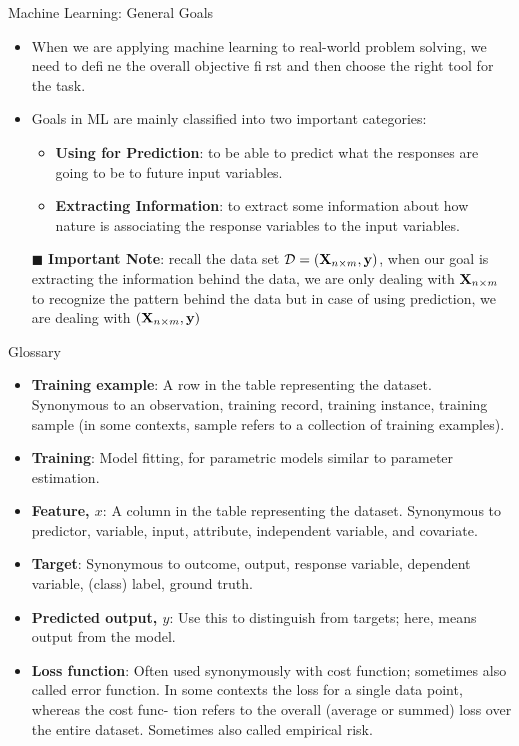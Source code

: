 \documentclass[compress,oilve]{beamer}
\begin{document}
\begin{frame}{Machine Learning: General Goals}
\begin{itemize}
\item When we are applying machine learning to real-world
problem solving, we need to define the overall objective first and then choose the right tool
for the task.
\item Goals in ML are mainly classified into two important categories:
\begin{itemize}
\item \textbf{Using for Prediction}: to be able to predict what the responses are going to be to future input variables.
\item \textbf{Extracting Information}: to extract some information about how nature is associating the response variables to the input variables.
\end{itemize}
\item[$\blacksquare$] \textbf{Important Note}: recall the data set $ \mathcal{D} = (\mathbf{X_{\mathnormal n \times \mathnormal m}} , \mathbf{y}) $, when our goal is extracting the information behind the data, we are only dealing with $ \mathbf{X_{\mathnormal n \times \mathnormal m}} $ to recognize the pattern behind the data but in case of using prediction, we are dealing with $ (\mathbf{X_{\mathnormal n \times \mathnormal m}} , \mathbf{y}) $
\end{itemize}
\end{frame}


\begin{frame}{Glossary}
\begin{itemize}
\item \textbf{Training example}: A row in the table representing the dataset. Synonymous to an observation, training record, training instance, training sample (in some contexts, sample refers to a collection of training examples).
\item \textbf{Training}: Model fitting, for parametric models similar to parameter estimation.
\item \textbf{Feature, $x$}: A column in the table representing the dataset. Synonymous to predictor, variable, input, attribute, independent variable, and covariate.
\item \textbf{Target}: Synonymous to outcome, output, response variable, dependent variable, (class) label, ground truth.
\item \textbf{Predicted output, $\hat{y}$}: Use this to distinguish from targets; here, means output from the model.
\item \textbf{Loss function}: Often used synonymously with cost function; sometimes also called error function. In some contexts the loss for a single data point, whereas the cost func- tion refers to the overall (average or summed) loss over the entire dataset. Sometimes also called empirical risk.

\end{itemize}
\end{frame}
\end{document}
